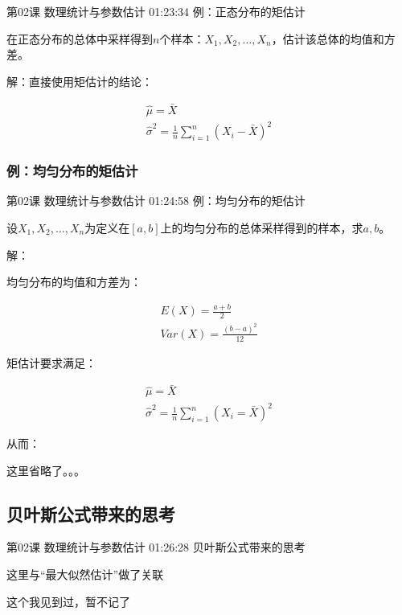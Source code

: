 \documentclass[UTF8]{ctexbook}
\begin{document}
第02课 数理统计与参数估计 01:23:34 例：正态分布的矩估计

在正态分布的总体中采样得到$n$个样本：$X_ {1},X_{2},\dots,X_{n}$，估计该总体的均值和方差。

解：直接使用矩估计的结论：

\begin{equation}
\begin{aligned}
\hat{\mu}=\bar{X} \\
\hat{\sigma}^{2}=\frac{1}{n}\sum_{i=1}^{n}(X_{i}-\bar{X})^{2}
\end{aligned}
\end{equation}

\subsubsection{例：均匀分布的矩估计}

第02课 数理统计与参数估计 01:24:58 例：均匀分布的矩估计

设$X_ {1},X_{2},\dots,X_{n}$为定义在$[a,b]$上的均匀分布的总体采样得到的样本，求$a,b$。

解：

均匀分布的均值和方差为：

\begin{equation}
\begin{aligned}
E(X)=\frac{a+b}{2} \\
Var(X)=\frac{(b-a)^{2}}{12}
\end{aligned}
\end{equation}

矩估计要求满足：

\begin{equation}
\begin{aligned}
\hat{\mu}=\bar{X} \\
\hat{\sigma}^{2}=\frac{1}{n}\sum_{i=1}^{n}(X_{i}=\bar{X})^{2}
\end{aligned}
\end{equation}

从而：

这里省略了。。。

\subsection{贝叶斯公式带来的思考}

第02课 数理统计与参数估计 01:26:28 贝叶斯公式带来的思考

这里与“最大似然估计”做了关联

这个我见到过，暂不记了
\end{document}
